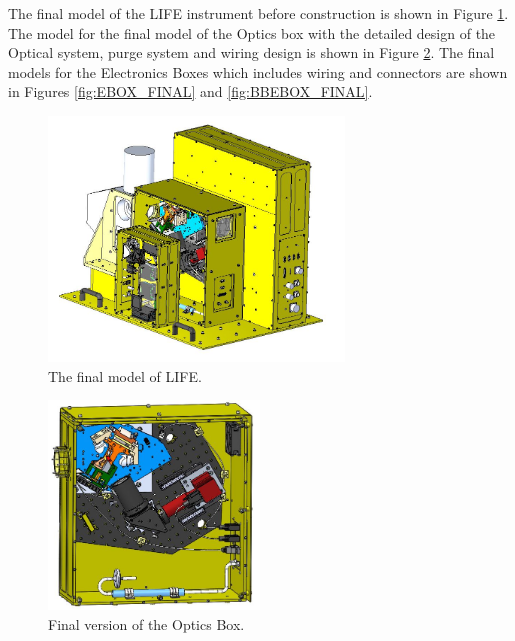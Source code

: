The final model of the LIFE instrument before construction is shown in Figure \ref{fig:LIFE_V5_final}. The model for the final model of the Optics box with the detailed design of the Optical system, purge system and wiring design is shown in Figure \ref{fig:OBOX_FINAL}. The final models for the Electronics Boxes which includes wiring and connectors are shown in Figures \ref{fig:EBOX_FINAL} and \ref{fig:BBEBOX_FINAL}.

\begin{figure}
    \centering
    \includegraphics[width=0.7\textwidth]{chap3_images/LIFE_V5_final_images/LIFE_V5_final_img.JPG}
    \caption{The final model of LIFE.}
    \label{fig:LIFE_V5_final}
\end{figure}

\begin{figure}
    \centering
    \includegraphics[width=0.5\textwidth]{chap3_images/LIFE_V5_final_images/Optics_Box_final.JPG}
    \caption{Final version of the Optics Box.}
    \label{fig:OBOX_FINAL}
\end{figure}

